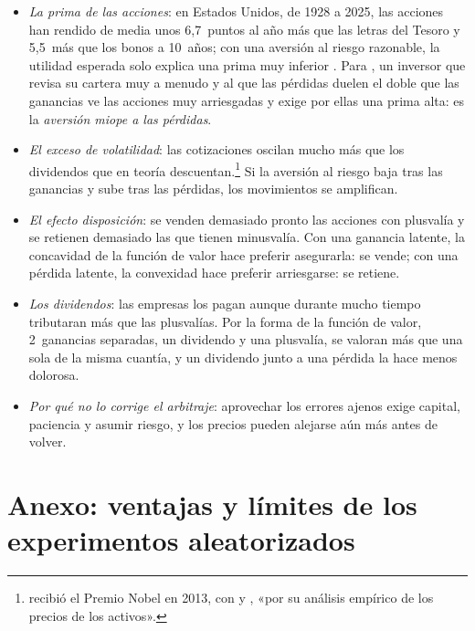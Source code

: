 \documentclass[11pt]{article}
\begin{document}
\begin{itemize}
\item \emph{La prima de las acciones}: en Estados Unidos, de 1928 a 2025, las acciones han rendido de media unos 6,7~puntos al año más que las letras del Tesoro y 5,5~más que los bonos a 10~años\nocite{Damodaran2026Historical}; con una aversión al riesgo razonable, la utilidad esperada solo explica una prima muy inferior\nocite{MehraPrescott1985Equity} . Para \textcite{BenartziThaler1995Myopic}, un inversor que revisa su cartera muy a menudo y al que las pérdidas duelen el doble que las ganancias ve las acciones muy arriesgadas y exige por ellas una prima alta: es la \emph{aversión miope a las pérdidas}.
\item \emph{El exceso de volatilidad}: las cotizaciones oscilan mucho más que los dividendos que en teoría descuentan\nocite{Shiller1981Stock}.\footnote{ recibió el Premio Nobel en 2013, con  y , «por su análisis empírico de los precios de los activos»\nocite{Nobel2013FamaHansenShiller}.} Si la aversión al riesgo baja tras las ganancias y sube tras las pérdidas, los movimientos se amplifican.
\item \emph{El efecto disposición}: se venden demasiado pronto las acciones con plusvalía y se retienen demasiado las que tienen minusvalía\nocite{ShefrinStatman1985Disposition}. Con una ganancia latente, la concavidad de la función de valor hace preferir asegurarla: se vende; con una pérdida latente, la convexidad hace preferir arriesgarse: se retiene.
\item \emph{Los dividendos}: las empresas los pagan aunque durante mucho tiempo tributaran más que las plusvalías. Por la forma de la función de valor, 2~ganancias separadas, un dividendo y una plusvalía, se valoran más que una sola de la misma cuantía, y un dividendo junto a una pérdida la hace menos dolorosa\nocite{ShefrinStatman1984Dividends,Thaler1985Mental}.
\item \emph{Por qué no lo corrige el arbitraje}: aprovechar los errores ajenos exige capital, paciencia y asumir riesgo, y los precios pueden alejarse aún más antes de volver\nocite{ShleiferVishny1997Limits}.
\end{itemize}

\section{Anexo: ventajas y límites de los experimentos aleatorizados}\label{anexo:rct}
\end{document}
